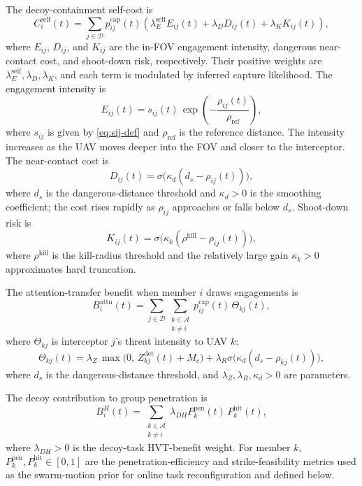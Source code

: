 \documentclass{cja}
\begin{document}
The decoy-containment self-cost is
\begin{equation}
C_i^{\mathrm{self}}(t)
=
\sum_{j\in\mathcal{D}}
p_{ij}^{\mathrm{cap}}(t)
\left(
\lambda_E^{\mathrm{self}} E_{ij}(t)
+
\lambda_D D_{ij}(t)
+
\lambda_K K_{ij}(t)
\right),
\end{equation}
where $E_{ij}$, $D_{ij}$, and $K_{ij}$ are the in-FOV engagement intensity, dangerous near-contact cost, and shoot-down risk, respectively. Their positive weights are $\lambda_E^{\mathrm{self}},\lambda_D,\lambda_K$, and each term is modulated by inferred capture likelihood. The engagement intensity is
\begin{equation}
E_{ij}(t)
=
s_{ij}(t)\,\exp\!\left(-\frac{\rho_{ij}(t)}{\rho_{\mathrm{ref}}}\right),
\end{equation}
where $s_{ij}$ is given by \eqref{eq:sij-def} and $\rho_{\mathrm{ref}}$ is the reference distance. The intensity increases as the UAV moves deeper into the FOV and closer to the interceptor. The near-contact cost is
\begin{equation}
D_{ij}(t)
=
\sigma\!\bigl(\kappa_d(d_s-\rho_{ij}(t))\bigr),
\end{equation}
where $d_s$ is the dangerous-distance threshold and $\kappa_d>0$ is the smoothing coefficient; the cost rises rapidly as $\rho_{ij}$ approaches or falls below $d_s$. Shoot-down risk is
\begin{equation}
K_{ij}(t)
=
\sigma\!\bigl(\kappa_k(\rho^{\mathrm{kill}}-\rho_{ij}(t))\bigr),
\end{equation}
where $\rho^{\mathrm{kill}}$ is the kill-radius threshold and the relatively large gain $\kappa_k>0$ approximates hard truncation.

The attention-transfer benefit when member $i$ draws engagements is
\begin{equation}
B_i^{\mathrm{attn}}(t)
=
\sum_{j\in\mathcal{D}}
\sum_{\substack{k\in\mathcal{A}\\k\neq i}}
p_{ij}^{\mathrm{cap}}(t)\,\Theta_{kj}(t),
\end{equation}
where $\Theta_{kj}$ is interceptor $j$'s threat intensity to UAV $k$:
\begin{equation}
\Theta_{kj}(t)
=
\lambda_Z\,\max\bigl(0,\, Z_{kj}^{\mathrm{det}}(t)+M_c\bigr)
+
\lambda_R \sigma\!\bigl(\kappa_d(d_s-\rho_{kj}(t))\bigr),
\end{equation}
where $d_s$ is the dangerous-distance threshold, and $\lambda_Z,\lambda_R,\kappa_d>0$ are parameters.

The decoy contribution to group penetration is
\begin{equation}
B_i^{H}(t)
=
\sum_{\substack{k\in\mathcal{A}\\k\neq i}}
\lambda_{DH} P_k^{\mathrm{pen}}(t)\,P_k^{\mathrm{hit}}(t),
\end{equation}
where $\lambda_{DH}>0$ is the decoy-task HVT-benefit weight. For member $k$, $P_k^{\mathrm{pen}},P_k^{\mathrm{hit}}\in[0,1]$ are the penetration-efficiency and strike-feasibility metrics used as the swarm-motion prior for online task reconfiguration and defined below.
\end{document}
